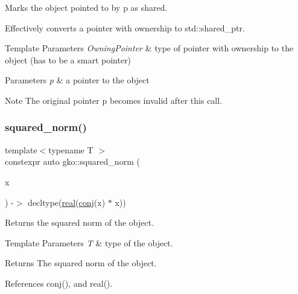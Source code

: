 Marks the object pointed to by {\ttfamily p} as shared. 

Effectively converts a pointer with ownership to std\+::shared\+\_\+ptr.


\begin{DoxyTemplParams}{Template Parameters}
{\em Owning\+Pointer} & type of pointer with ownership to the object (has to be a smart pointer)\\
\hline
\end{DoxyTemplParams}

\begin{DoxyParams}{Parameters}
{\em p} & a pointer to the object\\
\hline
\end{DoxyParams}
\begin{DoxyNote}{Note}
The original pointer {\ttfamily p} becomes invalid after this call. 
\end{DoxyNote}
\mbox{\label{namespacegko_abbb55709b10d707b2cbef803832aa834}} 
\subsubsection{\texorpdfstring{squared\+\_\+norm()}{squared\_norm()}}
{\footnotesize\ttfamily template$<$typename T $>$ \\
constexpr auto gko\+::squared\+\_\+norm (\begin{DoxyParamCaption}\item[{const T \&}]{x }\end{DoxyParamCaption}) -\/$>$ decltype(\hyperlink{namespacegko_ae23cfd886cee6e88d77bcbbbe1928b78}{real}(\hyperlink{namespacegko_acdaec5c4f959a948a6d0f3e99a57c7ea}{conj}(x) $\ast$ x))
\hspace{0.3cm}{\ttfamily [inline]}}



Returns the squared norm of the object. 


\begin{DoxyTemplParams}{Template Parameters}
{\em T} & type of the object.\\
\hline
\end{DoxyTemplParams}
\begin{DoxyReturn}{Returns}
The squared norm of the object. 
\end{DoxyReturn}


References conj(), and real().

